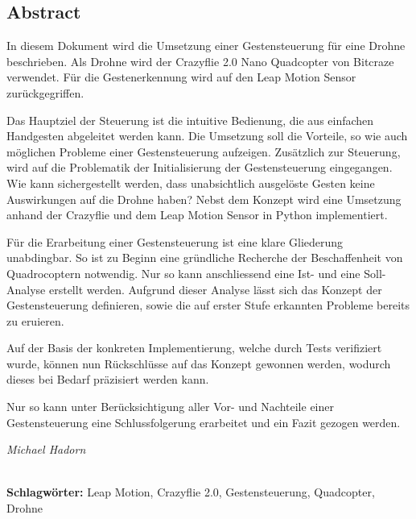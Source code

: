 
\subsection*{Abstract}
In diesem Dokument wird die Umsetzung einer Gestensteuerung für eine Drohne beschrieben. Als Drohne wird der Crazyflie 2.0 Nano Quadcopter von Bitcraze verwendet. Für die Gestenerkennung wird auf den Leap Motion Sensor zurückgegriffen.

Das Hauptziel der Steuerung ist die intuitive Bedienung, die aus einfachen Handgesten abgeleitet werden kann. Die Umsetzung soll die Vorteile, so wie auch möglichen Probleme einer Gestensteuerung aufzeigen. Zusätzlich zur Steuerung, wird auf die Problematik der Initialisierung der Gestensteuerung eingegangen. Wie kann sichergestellt werden, dass unabsichtlich ausgelöste Gesten keine Auswirkungen auf die Drohne haben? Nebst dem Konzept wird eine Umsetzung anhand der Crazyflie und dem Leap Motion Sensor in Python implementiert.

Für die Erarbeitung einer Gestensteuerung ist eine klare Gliederung unabdingbar. So ist zu Beginn eine gründliche Recherche der Beschaffenheit von Quadrocoptern notwendig. Nur so kann anschliessend eine Ist- und eine Soll-Analyse erstellt werden. Aufgrund dieser Analyse lässt sich das Konzept der Gestensteuerung definieren, sowie die auf erster Stufe erkannten Probleme bereits zu eruieren.

Auf der Basis der konkreten Implementierung, welche durch Tests verifiziert wurde, können nun Rückschlüsse auf das Konzept gewonnen werden, wodurch dieses bei Bedarf präzisiert werden kann.

Nur so kann unter Berücksichtigung aller Vor- und Nachteile einer Gestensteuerung eine Schlussfolgerung erarbeitet und ein Fazit gezogen werden.

\begin{flushright}
	\textit{Michael Hadorn}	
\end{flushright}

\vfill

%
\mbox{}\\[0.5\baselineskip]\noindent
\textbf{Schlagwörter:} 
Leap Motion, Crazyflie 2.0, Gestensteuerung, Quadcopter, Drohne


